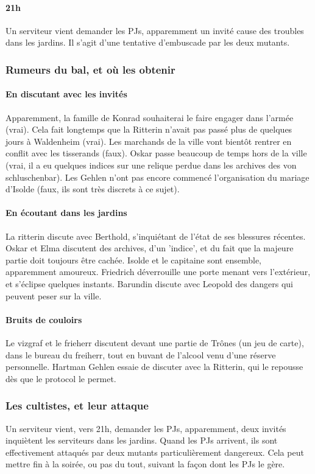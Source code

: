 \documentclass[10pt,a4paper]{book}
\begin{document}
\paragraph{21h} Un serviteur vient demander les PJs, apparemment un invité cause des troubles dans les jardins. Il s'agit d'une tentative d'embuscade par les deux mutants.
\subsubsection{Rumeurs du bal, et où les obtenir}
\paragraph{En discutant avec les invités}Apparemment, la famille de Konrad souhaiterai le faire engager dans l'armée (vrai). Cela fait longtemps que la Ritterin n'avait pas passé plus de quelques jours à Waldenheim (vrai). Les marchands de la ville vont bientôt rentrer en conflit avec les tisserands (faux). Oskar passe beaucoup de temps hors de la ville (vrai, il a eu quelques indices sur une relique perdue dans les archives des von schluschenbar). Les Gehlen n'ont pas encore commencé l'organisation du mariage d'Isolde (faux, ils sont très discrets à ce sujet).
\paragraph{En écoutant dans les jardins}La ritterin discute avec Berthold, s'inquiétant de l'état de ses blessures récentes. Oskar et Elma discutent des archives, d'un 'indice', et du fait que la majeure partie doit toujours être cachée. Isolde et le capitaine sont ensemble, apparemment amoureux. Friedrich déverrouille une porte menant vers l'extérieur, et s'éclipse quelques instants. Barundin discute avec Leopold des dangers qui peuvent peser sur la ville.
\paragraph{Bruits de couloirs}Le vizgraf et le frieherr discutent devant une partie de Trônes (un jeu de carte), dans le bureau du freiherr, tout en buvant de l'alcool venu d'une réserve personnelle. Hartman Gehlen essaie de discuter avec la Ritterin, qui le repousse dès que le protocol le permet.
\subsubsection{Les cultistes, et leur attaque}
Un serviteur vient, vers 21h, demander les PJs, apparemment, deux invités inquiètent les serviteurs dans les jardins. Quand les PJs arrivent, ils sont effectivement attaqués par deux mutants particulièrement dangereux. Cela peut mettre fin à la soirée, ou pas du tout, suivant la façon dont les PJs le gère.
\end{document}
